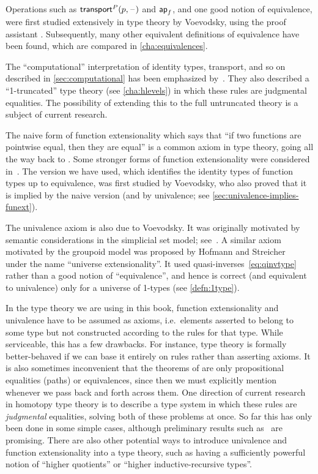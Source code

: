 %
Operations such as $\mathsf{transport}^{P}(p,\mathord{\hspace{1pt}\text{--}\hspace{1pt}})$ and $\mathsf{ap}_{f}$, and one good notion of equivalence, were first studied extensively in type theory by Voevodsky, using the proof assistant \Coq.
Subsequently, many other equivalent definitions of equivalence have been found, which are compared in \cref{cha:equivalences}.

The ``computational'' interpretation of identity types, transport, and so on described in \cref{sec:computational} has been emphasized by~\cite{lh:canonicity}.
They also described a ``1-truncated'' type theory (see \cref{cha:hlevels}) in which these rules are judgmental equalities.
The possibility of extending this to the full untruncated theory is a subject of current research.

%
The naive form of function extensionality which says that ``if two functions are pointwise equal, then they are equal'' is a common axiom in type theory, going all the way back to \cite{PM2}.
Some stronger forms of function extensionality were considered in~\cite{garner:depprod}.
The version we have used, which identifies the identity types of function types up to equivalence, was first studied by Voevodsky, who also proved that it is implied by the naive version (and by univalence; see \cref{sec:univalence-implies-funext}).

%
The univalence axiom is also due to Voevodsky.
It was originally motivated by semantic considerations in the simplicial set model; see~\cite{klv:ssetmodel}.
A similar axiom motivated by the groupoid model was proposed by Hofmann and Streicher~\cite{hs:gpd-typethy} under the name ``universe extensionality''.
It used quasi-inverses~\eqref{eq:qinvtype} rather than a good notion of ``equivalence'', and hence is correct (and equivalent to univalence) only for a universe of 1-types (see \cref{defn:1type}).

In the type theory we are using in this book, function extensionality and univalence have to be assumed as axioms, i.e.\ elements asserted to belong to some type but not constructed according to the rules for that type.
While serviceable, this has a few drawbacks.
For instance, type theory is formally better-behaved if we can base it entirely on rules rather than asserting axioms.
It is also sometimes inconvenient that the theorems of  are only propositional equalities (paths) or equivalences, since then we must explicitly mention whenever we pass back and forth across them.
One direction of current research in homotopy type theory is to describe a type system in which these rules are \emph{judgmental} equalities, solving both of these problems at once.
So far this has only been done in some simple cases, although preliminary results such as~\cite{lh:canonicity} are promising.
There are also other potential ways to introduce univalence and function extensionality into a type theory, such as having a sufficiently powerful notion of ``higher quotients'' or ``higher inductive-recursive types''.

